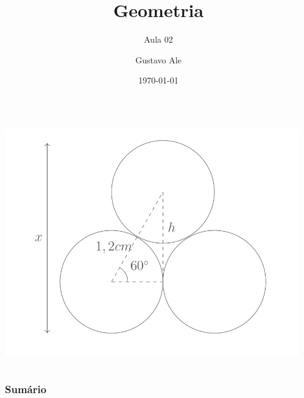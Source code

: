\documentclass[handout]{beamer}
\title{Geometria} %
\subtitle{Aula 02}
\author{Gustavo Ale} %
\institute[UFMT] %
{
EduCursinho - Faculdade de Engenharia \\ %
\medskip
\textit{gustavo.engca@gmail.com} %
}
\date{\today} %
\begin{document}
{
\begin{frame}
    \begin{columns}
        \begin{column}{0.48\textwidth}
            \includegraphics[width=\columnwidth,left]{../assets/geo.png}
        \end{column}
        \begin{column}{0.48\textwidth}
            \titlepage
        \end{column}
    \end{columns}

\end{frame}
}


\begin{frame}
    \frametitle{Sumário} %
    \tableofcontents %
\end{frame}
\end{document}
